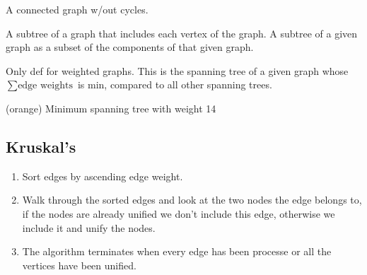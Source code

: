  A connected graph w/out cycles.

 A subtree of a graph that includes each vertex of the graph.
A subtree of a given graph as a subset of the components of that given graph.

 Only def for weighted graphs.
This is the spanning tree of a given graph whose $\sum\text{edge weights}$ is min, compared
to all other spanning trees.



{\scriptsize ({\color{orange}orange}) Minimum spanning tree with weight 14}

\subsection*{Kruskal's}
\begin{enumerate}
    \item Sort edges by ascending edge weight.
    \item Walk through the sorted edges and look at the two nodes the edge belongs
        to, if the nodes are already unified we don't include this edge, otherwise
        we include it and unify the nodes.
    \item The algorithm terminates when every edge has been processe or all the vertices
        have been unified.
\end{enumerate}

